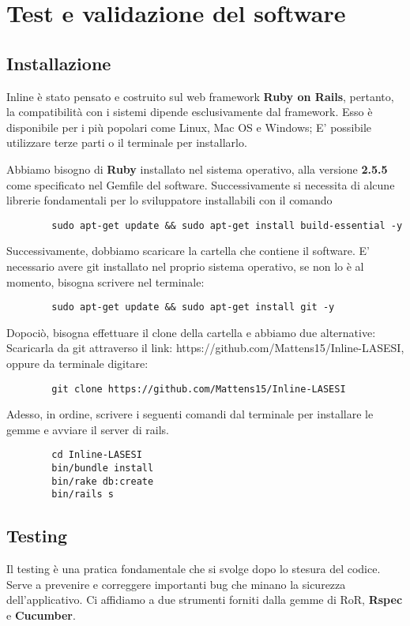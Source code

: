 \chapter{Test e validazione del software}

	\section{Installazione}
	Inline è stato pensato e costruito sul web framework \textbf{Ruby on Rails}, pertanto, la compatibilità con i sistemi dipende esclusivamente dal framework. Esso è disponibile per i più popolari come Linux, Mac OS e Windows; E' possibile utilizzare terze parti o il terminale per installarlo.
	
	Abbiamo bisogno di \textbf{Ruby} installato nel sistema operativo, alla versione \textbf{2.5.5} come specificato nel Gemfile del software. Successivamente si necessita di alcune librerie fondamentali per lo sviluppatore installabili con il comando
	\begin{lstlisting}
		sudo apt-get update && sudo apt-get install build-essential -y
	\end{lstlisting}
	
	Successivamente, dobbiamo scaricare la cartella che contiene il software. E' necessario avere git installato nel proprio sistema operativo, se non lo è al momento, bisogna scrivere nel terminale:
	\begin{lstlisting}
		sudo apt-get update && sudo apt-get install git -y
	\end{lstlisting}
	
	Dopociò, bisogna effettuare il clone della cartella e abbiamo due alternative: Scaricarla da git attraverso il link: https://github.com/Mattens15/Inline-LASESI, oppure da terminale digitare:
	\begin{lstlisting}
		git clone https://github.com/Mattens15/Inline-LASESI
	\end{lstlisting}
	
	Adesso, in ordine, scrivere i seguenti comandi dal terminale per installare le gemme e avviare il server di rails.
	\begin{lstlisting}
		cd Inline-LASESI
		bin/bundle install
		bin/rake db:create
		bin/rails s
	\end{lstlisting}
	
	\section[Attrvaverso unit e integration testing]{Testing}
	Il testing è una pratica fondamentale che si svolge dopo lo stesura del codice. Serve a prevenire e correggere importanti bug che minano la sicurezza dell'applicativo.
	Ci affidiamo a due strumenti forniti dalla gemme di RoR, \textbf{Rspec} e \textbf{Cucumber}.
	
